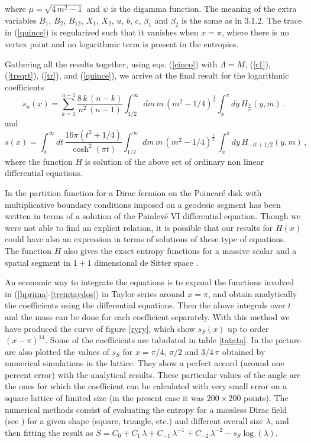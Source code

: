 \documentclass[a4paper]{article}
\begin{document}
where $\mu=\sqrt{4\,m^2-1}$ and $\psi$ is the digamma function. The meaning of the extra variables $B_1$, $B_2$, $B_{12}$, $X_1$, $X_2$, $u$, $b$, $c$, $\beta_1$ and $\beta_2$ is the same as in 3.1.2. The trace in (\ref{quince}) is regularized such that it vanishes when $x=\pi$, where there is no vertex point and no logarithmic term is present in the entropies. 

Gathering all the results together, using eqs. (\ref{cinco}) with $\Lambda =M$, (\ref{r1}), (\ref{trsqrt}), (\ref{tr}), and (\ref{quince}), we arrive at the final result for the logarithmic coefficients 
\begin{equation}
s_n(x)= \sum_{k=1}^{n-1}\frac{8\,k\,(n-k)}{n^2\,(n-1)}\int_{1/2}^{\infty}dm\,m\,(m^2-1/4)^{\frac{1}{2}}\int_{x}^{\pi}dy \,H_\frac{k}{n}(y,m)\,.
\label{finalescalar}
\end{equation}
and 
\begin{equation}
s(x)=\int_0^\infty dt \, \frac{16\pi (t^2+1/4)}{\cosh^2(\pi t)} \int_{1/2}^{\infty}dm\,m\,\left(m^2-1/4\right)^{\frac{1}{2}}\,\int_{x}^{\pi}dy \,H_{-it+1/2}(y,m) \,,
\label{finalescalar1}
\end{equation}
where the function $H$ is solution of the above set of ordinary non linear differential equations. 



In  \cite{pain} the partition function for a Dirac fermion on the Poincar\'e disk with multiplicative boundary conditions imposed on a geodesic segment  has been written in terms of a solution of the Painlev\'e VI differential equation. Though we were not able to find an explicit relation, it is possible that our results for $H(x)$ could have also an expression in terms of solutions of these type of equations. 
The function $H$ also gives the exact entropy functions for a massive scalar and a spatial segment in $1+1$ dimensional de Sitter space \cite{log}. 
 
 
 
An economic way to integrate the equations is to expand the functions involved in (\ref{hprima}-\ref{treintaydos}) in Taylor series around $x=\pi$, and obtain analytically the coefficients using the differential equations. Then the above integrals over $t$ and the mass can be done for each coefficient separately. With this method we have produced the curve of figure \ref{ryry}, which show $s_S(x)$ up to order $(x-\pi)^{14}$. Some of the coefficients are tabulated in table \ref{tatata}. In the picture are also plotted the values of $s_S$ for $x=\pi / 4$, $\pi /2$ and $3/4 \,\pi$ obtained by numerical simulations in the lattice. They show a perfect accord (around one percent error) with the analytical results. These particular values of the angle are the ones for which the coefficient can be calculated with very small error on a square lattice of limited size (in the present case it was $200\times 200$ points). The numerical methods consist of evaluating the entropy for a massless Dirac field  (see \cite{log}) for a given shape (square, triangle, etc.) and different overall size $\lambda$, and then fitting the result as $S=C_0+C_1\, \lambda+C_{-1}\, \lambda^{-1} +C_{-2} \,\lambda^{-2}- s_S \log(\lambda)$. 
 
\end{document}
